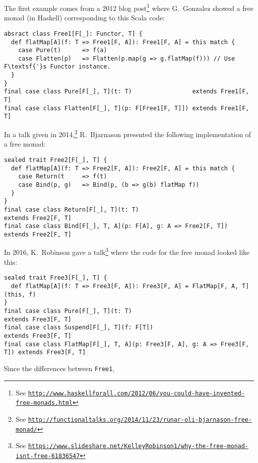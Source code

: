The first example comes from a 2012 blog post\footnote{See \texttt{\href{http://www.haskellforall.com/2012/06/you-could-have-invented-free-monads.html}{http://www.haskellforall.com/2012/06/you-could-have-invented-free-monads.html}}}
where G.~Gonzalez
showed a free monad (in Haskell) corresponding to this Scala code:
\begin{lstlisting}
absract class Free1[F[_]: Functor, T] {
  def flatMap[A](f: T => Free1[F, A]): Free1[F, A] = this match {
    case Pure(t)      => f(a)
    case Flatten(p)   => Flatten(p.map(g => g.flatMap(f))) // Use F\textsf{'}s Functor instance.
  }
}
final case class Pure[F[_], T](t: T)                 extends Free1[F, T]
final case class Flatten[F[_], T](p: F[Free1[F, T]]) extends Free1[F, T] 
\end{lstlisting}
In a talk given in 2014,\footnote{See \texttt{\href{http://functionaltalks.org/2014/11/23/runar-oli-bjarnason-free-monad/}{http://functionaltalks.org/2014/11/23/runar-oli-bjarnason-free-monad/}}}
R.~Bjarnason presented the following
implementation of a free monad:
\begin{lstlisting}
sealed trait Free2[F[_], T] {
  def flatMap[A](f: T => Free2[F, A]): Free2[F, A] = this match {
    case Return(t     => f(t)
    case Bind(p, g)   => Bind(p, (b => g(b) flatMap f))
  }
}
final case class Return[F[_], T](t: T)                          extends Free2[F, T]
final case class Bind[F[_], T, A](p: F[A], g: A => Free2[F, T]) extends Free2[F, T]
\end{lstlisting}
In 2016, K.~Robinson gave a talk\footnote{See \texttt{\href{https://www.slideshare.net/KelleyRobinson1/why-the-free-monad-isnt-free-61836547}{https://www.slideshare.net/KelleyRobinson1/why-the-free-monad-isnt-free-61836547}}}
where the code for the free monad looked like this:
\begin{lstlisting}
sealed trait Free3[F[_], T] {
  def flatMap[A](f: T => Free3[F, A]): Free3[F, A] = FlatMap[F, A, T](this, f) 
}
final case class Pure[F[_], T](t: T)                                      extends Free3[F, T]
final case class Suspend[F[_], T](f: F[T])                                extends Free3[F, T]
final case class FlatMap[F[_], T, A](p: Free3[F, A], g: A => Free3[F, T]) extends Free3[F, T]
\end{lstlisting}
Since the differences between \lstinline!Free1!,
